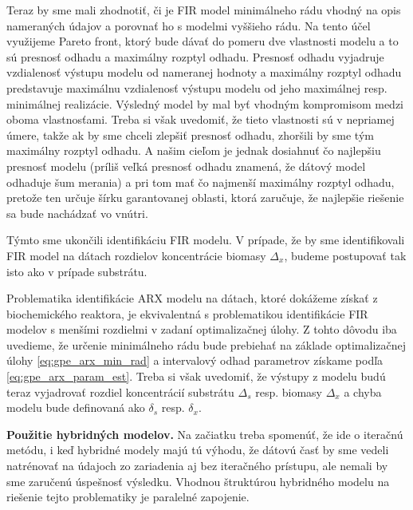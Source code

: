Teraz by sme mali zhodnotiť, či je FIR model minimálneho rádu vhodný na opis nameraných údajov a porovnať ho s modelmi vyššieho rádu. Na tento účel využijeme Pareto front, ktorý bude dávať do pomeru dve vlastnosti modelu a to sú presnosť odhadu a maximálny rozptyl odhadu. Presnosť odhadu vyjadruje vzdialenosť výstupu modelu od nameranej hodnoty a maximálny rozptyl odhadu predstavuje maximálnu vzdialenosť výstupu modelu od jeho maximálnej resp. minimálnej realizácie. Výsledný model by mal byť vhodným kompromisom medzi oboma vlastnosťami. Treba si však uvedomiť, že tieto vlastnosti sú v nepriamej úmere, takže ak by sme chceli zlepšiť presnosť odhadu, zhoršili by sme tým maximálny rozptyl odhadu. A našim cieľom je jednak dosiahnuť čo najlepšiu presnosť modelu (príliš veľká presnosť odhadu znamená, že dátový model odhaduje šum merania) a pri tom mať čo najmenší maximálny rozptyl odhadu, pretože ten určuje šírku garantovanej oblasti, ktorá zaručuje, že najlepšie riešenie sa bude nachádzať vo vnútri.

Týmto sme ukončili identifikáciu FIR modelu. V prípade, že by sme identifikovali FIR model na dátach rozdielov koncentrácie biomasy $ \Delta_{x} $, budeme postupovať tak isto ako v prípade substrátu.

Problematika identifikácie ARX modelu na dátach, ktoré dokážeme získať z biochemického reaktora, je ekvivalentná s problematikou identifikácie FIR modelov s menšími rozdielmi v zadaní optimalizačnej úlohy. Z tohto dôvodu iba uvedieme, že určenie minimálneho rádu bude prebiehať na základe optimalizačnej úlohy \eqref{eq:gpe_arx_min_rad} a intervalový odhad parametrov získame podľa \eqref{eq:gpe_arx_param_est}.
Treba si však uvedomiť, že výstupy z modelu budú teraz vyjadrovať rozdiel koncentrácií substrátu $ \Delta_{s} $ resp. biomasy $ \Delta_{x} $ a chyba modelu bude definovaná ako $ \delta_{s} $ resp. $ \delta_{x} $.

\textbf{Použitie hybridných modelov.}
Na začiatku treba spomenúť, že ide o iteračnú metódu, i keď hybridné modely majú tú výhodu, že dátovú časť by sme vedeli natrénovať na údajoch zo zariadenia aj bez iteračného prístupu, ale nemali by sme zaručenú úspešnosť výsledku. 
Vhodnou štruktúrou hybridného modelu na riešenie tejto problematiky je paralelné zapojenie.

